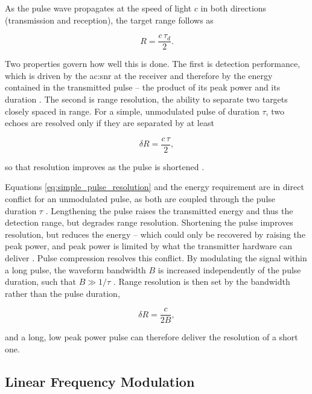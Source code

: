 As the pulse wave propagates at the speed of light $c$ in both directions (transmission and reception), the target range follows as

\begin{equation}
  R = \frac{c\,\tau_d}{2}.
  \label{eq:radar_range}
\end{equation}

Two properties govern how well this is done. The first is detection performance, which is driven by the \gls{ac:snr} at the receiver and therefore by the energy contained in the transmitted pulse -- the product of its peak power and its duration \cite{pomr}. The second is range resolution, the ability to separate two targets closely spaced in range. For a simple, unmodulated pulse of duration $\tau$, two echoes are resolved only if they are separated by at least

\begin{equation}
  \delta R = \frac{c\,\tau}{2},
  \label{eq:simple_pulse_resolution}
\end{equation}

so that resolution improves as the pulse is shortened \cite{pomr}.

Equations \eqref{eq:simple_pulse_resolution} and the energy requirement are in direct conflict for an unmodulated pulse, as both are coupled through the pulse duration $\tau$ \cite{pomr}. Lengthening the pulse raises the transmitted energy and thus the detection range, but degrades range resolution. Shortening the pulse improves resolution, but reduces the energy -- which could only be recovered by raising the peak power, and peak power is limited by what the transmitter hardware can deliver \cite{marthinmon}. Pulse compression resolves this conflict. By modulating the signal within a long pulse, the waveform bandwidth $B$ is increased independently of the pulse duration, such that $B \gg 1/\tau$ \cite{pomr}. Range resolution is then set by the bandwidth rather than the pulse duration,

\begin{equation}
  \delta R = \frac{c}{2B},
  \label{eq:range_resolution}
\end{equation}

and a long, low peak power pulse can therefore deliver the resolution of a short one.

\subsection{Linear Frequency Modulation}\label{sec:linear_frequency_modulation}

